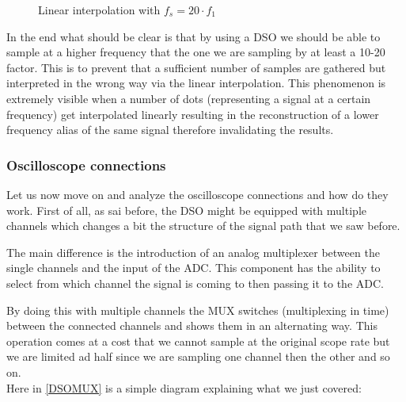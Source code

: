 \documentclass[../main.tex]{subfiles}
\begin{document}
\begin{figure}[h!]
\begin{center}
\end{center}
\caption{Linear interpolation with $f_s = 20 \cdot f_1$}
\label{ventifreq}
\end{figure}

In the end what should be clear is that by using a DSO we should be able to sample at a higher frequency that the one we are sampling by at least a 10-20 factor. This is to prevent that a sufficient number of samples are gathered but interpreted in the wrong way via the linear interpolation. This phenomenon is extremely visible when a number of dots (representing a signal at a certain frequency) get interpolated linearly resulting in the reconstruction of a lower frequency alias of the same signal therefore invalidating the results.

\subsubsection{Oscilloscope connections}

Let us now move on and analyze the oscilloscope connections and how do they work.
First of all, as sai before, the DSO might be equipped with multiple channels which changes a bit the structure of the signal path that we saw before.


The main difference is the introduction of an analog multiplexer between the single channels and the input of the ADC. This component has the ability to select from which channel the signal is coming to then passing it to the ADC. 

By doing this with multiple channels the MUX switches (multiplexing in time) between the connected channels and shows them in an alternating way. This operation comes at a cost that we cannot sample at the original scope rate but we are limited ad half since we are sampling one channel then the other and so on.\\

Here in \autoref{DSOMUX} is a simple diagram explaining what we just covered:
\end{document}
